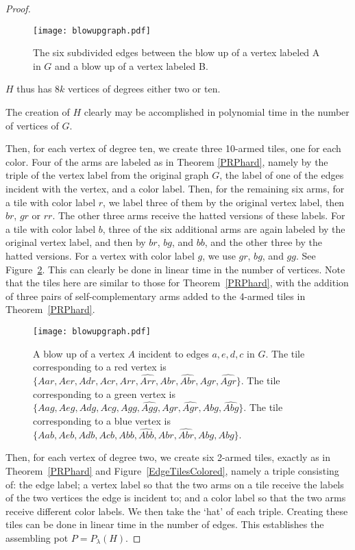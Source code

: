 \documentclass{elsarticle}
\theoremstyle{definition}
\theoremstyle{remark}
\theoremstyle{plain}
\theoremstyle{plain}
\begin{document}
\begin{proof}
 \begin{figure}
  \centering   
  \texttt{[image: blowupgraph.pdf]}
  \caption{The six subdivided edges between the blow up of a vertex labeled A in $G$ and a blow up of a vertex labeled B.}
  \label{sixedges}
  \end{figure} 
 
 
 
 $H$ thus has $8k$ vertices of degrees either two or ten.   
 
 The creation of $H$ clearly may be accomplished in polynomial time in the number of vertices of $G$.
 
 Then, for each vertex of degree ten, we create three 10-armed tiles, one for each color.  Four of the arms are labeled as in Theorem \ref{PRPhard}, namely by the triple of the vertex label from the original graph $G$,  the label of one of the edges incident with the vertex, and a color label.  Then, for the remaining six arms, for a tile with color label $r$, we label three of them by the original vertex label, then $br$, $gr$ or $rr$.  The other three arms receive the hatted versions of these labels.   For a tile with color label $b$, three of the six additional arms are again labeled by the original vertex label, and then by $br$, $bg$, and $bb$, and the other three by the hatted versions.  For a vertex with color label $g$, we use $gr$, $bg$, and $gg$.  See Figure~\ref{Htiles}.
  This can clearly be done in linear time in the number of vertices.   Note that the tiles here are similar to those for Theorem~\ref{PRPhard}, with the addition of three pairs of self-complementary arms added to the 4-armed tiles in Theorem~\ref{PRPhard}.   

\begin{figure}
  \centering   
  \texttt{[image: blowupgraph.pdf]}
  \caption{A blow up of a vertex $A$ incident to edges $a,e,d,c$ in $G$.  The tile corresponding to a red vertex is $\{Aar, Aer, Adr, Acr, Arr, \widehat{Arr}, Abr, \widehat{Abr}, Agr, \widehat{Agr}\}$.  The tile corresponding to a green vertex is $\{Aag, Aeg, Adg, Acg, Agg, \widehat{Agg}, Agr, \widehat{Agr}, Abg, \widehat{Abg}\}$.   The tile corresponding to a blue vertex is $\{Aab, Aeb, Adb, Acb, Abb, \widehat{Abb}, Abr, \widehat{Abr}, Abg, \widehat{Abg}\}$.}
  \label{Htiles}
  \end{figure} 

  Then, for each vertex of degree two, we create six 2-armed tiles, exactly as in Theorem~\ref{PRPhard} and Figure~\ref{EdgeTilesColored}, namely a    triple consisting of: the edge label; a vertex label so that the two arms on a tile receive the labels of the two vertices the edge is incident to; and a color label so that the two arms receive different color labels. We then take the `hat' of each triple.  Creating these tiles can be done in linear time in the number of edges.
 This establishes the assembling pot $P=P_{\lambda}(H)$.
 

\end{proof}
\end{document}
